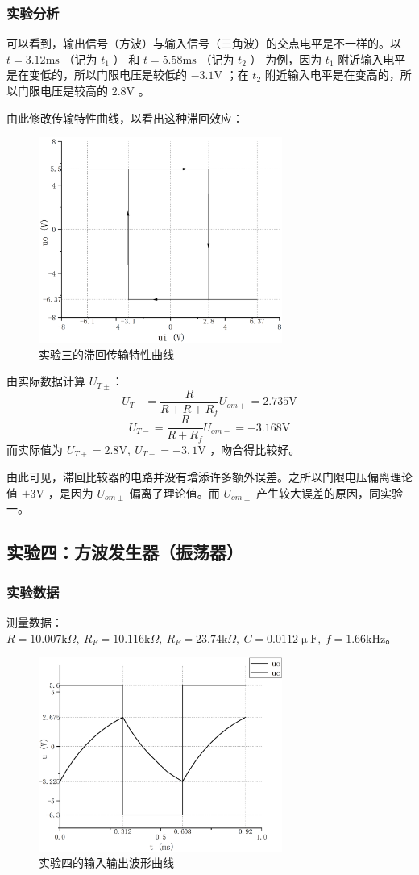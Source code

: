 \documentclass[a4paper,11pt,UTF8]{ctexart}
\newcommand\mr[1]{\mathrm{#1}}
\begin{document}
	\subsubsection{实验分析}
		可以看到，输出信号（方波）与输入信号（三角波）的交点电平是不一样的。以 $t=3.12\mr{ms}$ （记为 $t_1$ ） 和 $t=5.58\mr{ms}$ （记为 $t_2$ ） 为例，因为 $t_1$ 附近输入电平是在变低的，所以门限电压是较低的 $-3.1\mr{V}$ ；在 $t_2$ 附近输入电平是在变高的，所以门限电压是较高的 $2.8\mr{V}$ 。
		\par 由此修改传输特性曲线，以看出这种滞回效应：
		\begin{figure}[H]
		 \centering
		 \includegraphics[width=8cm]{3-2-edited}
		 \caption{实验三的滞回传输特性曲线}
		 \label{fig:3-2-e}
		\end{figure}
		\par 由实际数据计算 $U_{T\pm}$：
		\[ U_{T+}=\frac{R}{R+R+R_f}U_{om+}=2.735\mr{V} \]
		\[ U_{T-}=\frac{R}{R+R_f}U_{om-}=-3.168\mr{V} \]
		而实际值为 $U_{T+}=2.8\mr{V},~U_{T-}=-3,1\mr{V}$ ，吻合得比较好。
		\par 由此可见，滞回比较器的电路并没有增添许多额外误差。之所以门限电压偏离理论值 $\pm3\mr{V}$ ，是因为 $U_{om\pm}$ 偏离了理论值。而 $U_{om\pm}$ 产生较大误差的原因，同实验一。
\subsection{实验四：方波发生器（振荡器）}
	\subsubsection{实验数据}
		测量数据：$R=10.007\mr{k}\Omega,~R_F=10.116\mr{k}\Omega,~R_F=23.74\mr{k}\Omega,~C=0.0112\upmu\mr{F},~f=1.66\mr{kHz}$。
		\begin{figure}[H]
		 \centering
		 \includegraphics[width=8cm]{4}
		 \caption{实验四的输入输出波形曲线}
		 \label{fig:4}
		\end{figure}
\end{document}
